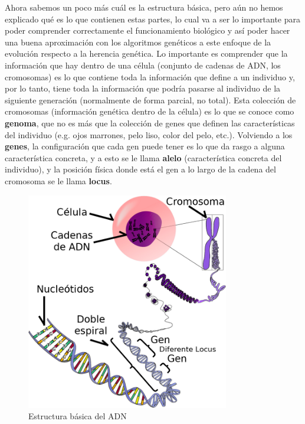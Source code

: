 Ahora sabemos un poco más cuál es la estructura básica, pero aún no hemos explicado qué es lo que contienen estas partes, lo cual va a ser lo importante para poder comprender correctamente el funcionamiento biológico y así poder hacer una buena aproximación con los algoritmos genéticos a este enfoque de la evolución respecto a la herencia genética. Lo importante es comprender que la información que hay dentro de una célula (conjunto de cadenas de ADN, los cromosomas) es lo que contiene toda la información que define a un individuo y, por lo tanto, tiene toda la información que podría pasarse al individuo de la siguiente generación (normalmente de forma parcial, no total). Esta colección de cromosomas (información genética dentro de la célula) es lo que se conoce como \textbf{genoma}, que no es más que la colección de genes que definen las características del individuo (e.g. ojos marrones, pelo liso, color del pelo, etc.). Volviendo a los \textbf{genes}, la configuración que cada gen puede tener es lo que da rasgo a alguna característica concreta, y a esto se le llama \textbf{alelo} (característica concreta del individuo), y la posición física donde está el gen a lo largo de la cadena del cromosoma se le llama \textbf{locus}.

\begin{figure}[h]
	\centering
	\includegraphics[width=0.79\textwidth]{Figures/basicDNAStructure}
	\caption{Estructura básica del ADN}
	\label{fig:basicDNAStructure}
\end{figure}

